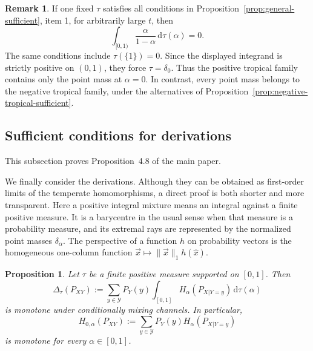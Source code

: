 \documentclass[aps,pra,11pt,onecolumn,nofootinbib,tightenlines]{revtex4-2}
\newtheorem{proposition}[theorem]{Proposition}
\theoremstyle{definition}
\newtheorem{remark}[theorem]{Remark}
\begin{document}
\begin{remark}
\label{rem:positive-tropical-endpoint}
If one fixed $\tau$ satisfies all conditions in Proposition~\ref{prop:general-sufficient}, item 1, for arbitrarily large $t$, then
\begin{equation}
 \int_{[0,1)}\frac{\alpha}{1-\alpha}\,\mathrm d\tau(\alpha)=0.
\end{equation}
The same conditions include $\tau(\{1\})=0$. Since the displayed integrand is strictly positive on $(0,1)$, they force $\tau=\delta_0$.
Thus the positive tropical family contains only the point mass at $\alpha=0$.
In contrast, every point mass belongs to the negative tropical family, under
the alternatives of Proposition~\ref{prop:negative-tropical-sufficient}.
\end{remark}

\subsection{Sufficient conditions for derivations}

This subsection proves Proposition~4.8 of the main paper.

We finally consider the derivations. Although they can be obtained as first-order limits of the temperate homomorphisms, a direct proof is both shorter and more transparent.
Here a positive integral mixture means an integral against a finite positive
measure.  It is a barycentre in the usual sense when that measure is a
probability measure, and its extremal rays are represented by the normalized
point masses $\delta_\alpha$.  The
perspective of a function $h$ on probability vectors is the homogeneous
one-column function $\vec x\mapsto\|\vec x\|_1h(\widehat x)$.

\begin{proposition}
\label{prop:derivation-sufficient}
Let $\tau$ be a finite positive measure supported on $[0,1]$. Then
\begin{equation}
 \Delta_\tau(P_{XY})
 :=\sum_{y\in\mathcal Y}P_Y(y)
   \int_{[0,1]}H_\alpha(P_{X|Y=y})\,\mathrm d\tau(\alpha)
 \label{eq:general-derivation-barycentre}
\end{equation}
 is monotone under conditionally mixing channels. In particular,
\begin{equation}
 H_{0,\alpha}(P_{XY})
 :=\sum_{y\in\mathcal Y}P_Y(y)H_\alpha(P_{X|Y=y})
 \label{eq:extremal-derivation}
\end{equation}
 is monotone for every $\alpha\in[0,1]$.
\end{proposition}
\end{document}
